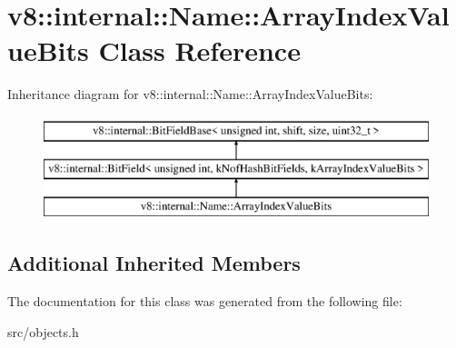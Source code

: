 \hypertarget{classv8_1_1internal_1_1_name_1_1_array_index_value_bits}{}\section{v8\+:\+:internal\+:\+:Name\+:\+:Array\+Index\+Value\+Bits Class Reference}
\label{classv8_1_1internal_1_1_name_1_1_array_index_value_bits}
Inheritance diagram for v8\+:\+:internal\+:\+:Name\+:\+:Array\+Index\+Value\+Bits\+:\begin{figure}[H]
\begin{center}
\leavevmode
\includegraphics[height=3.000000cm]{classv8_1_1internal_1_1_name_1_1_array_index_value_bits}
\end{center}
\end{figure}
\subsection*{Additional Inherited Members}


The documentation for this class was generated from the following file\+:\begin{DoxyCompactItemize}
\item 
src/objects.\+h\end{DoxyCompactItemize}

